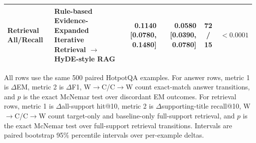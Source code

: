 \begin{table}
\begin{tabularx}{\textheight}{>{\raggedright\arraybackslash}p{0.15\textheight}
                            >{\raggedright\arraybackslash}X
                            r r c c}
Retrieval All/Recall & Rule-based Evidence-Expanded Iterative Retrieval $\rightarrow$ HyDE-style RAG & 0.1140 [0.0780, 0.1480] & 0.0580 [0.0390, 0.0780] & 72 / 15 & $<0.0001$ \\
\bottomrule
\end{tabularx}
\begin{tablenotes}
\footnotesize
\item All rows use the same 500 paired HotpotQA examples. For answer rows, metric 1 is $\Delta$EM, metric 2 is $\Delta$F1, W$\rightarrow$C/C$\rightarrow$W count exact-match answer transitions, and $p$ is the exact McNemar test over discordant EM outcomes. For retrieval rows, metric 1 is $\Delta$all-support hit@10, metric 2 is $\Delta$supporting-title recall@10, W$\rightarrow$C/C$\rightarrow$W count target-only and baseline-only full-support retrieval, and $p$ is the exact McNemar test over full-support retrieval transitions. Intervals are paired bootstrap 95\% percentile intervals over per-example deltas.
\end{tablenotes}
\end{table}
